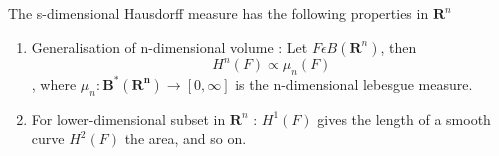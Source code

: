 \begin{theorem}
    The s-dimensional Hausdorff measure has the following properties in
    $\bm{R}^n$
    \begin{enumerate}
        \item Generalisation of n-dimensional volume : Let $F \epsilon
            B(\bm{R}^n)$, then
            \[
                H^n(F) \propto \mu_n(F)
            \]
            , where $\mu_n : \bm{B^*(R^n)} \to [0, \infty]$ is the n-dimensional lebesgue
            measure.
        \item For lower-dimensional subset in $\bm{R}^n$ : %
            $H^1(F)$ gives the length of a smooth curve
            \newline $H^2(F)$ the area, and so on.
    \end{enumerate}
\end{theorem}

